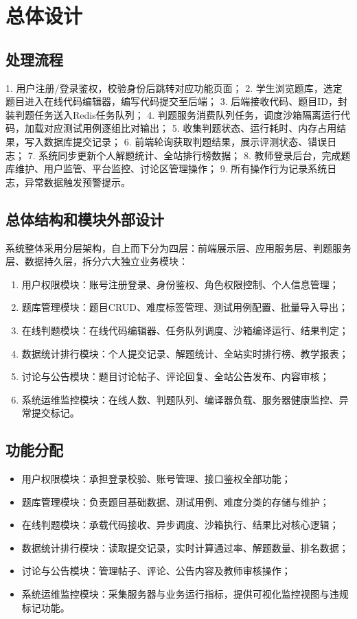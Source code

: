 \documentclass{../template/softeng}
\begin{document}
\section{总体设计}
\subsection{处理流程}
1. 用户注册/登录鉴权，校验身份后跳转对应功能页面；
2. 学生浏览题库，选定题目进入在线代码编辑器，编写代码提交至后端；
3. 后端接收代码、题目ID，封装判题任务送入Redis任务队列；
4. 判题服务消费队列任务，调度沙箱隔离运行代码，加载对应测试用例逐组比对输出；
5. 收集判题状态、运行耗时、内存占用结果，写入数据库提交记录；
6. 前端轮询获取判题结果，展示评测状态、错误日志；
7. 系统同步更新个人解题统计、全站排行榜数据；
8. 教师登录后台，完成题库维护、用户监管、平台监控、讨论区管理操作；
9. 所有操作行为记录系统日志，异常数据触发预警提示。

\subsection{总体结构和模块外部设计}
系统整体采用分层架构，自上而下分为四层：前端展示层、应用服务层、判题服务层、数据持久层，拆分六大独立业务模块：
\begin{enumerate}
    \item 用户权限模块：账号注册登录、身份鉴权、角色权限控制、个人信息管理；
    \item 题库管理模块：题目CRUD、难度标签管理、测试用例配置、批量导入导出；
    \item 在线判题模块：在线代码编辑器、任务队列调度、沙箱编译运行、结果判定；
    \item 数据统计排行模块：个人提交记录、解题统计、全站实时排行榜、教学报表；
    \item 讨论与公告模块：题目讨论帖子、评论回复、全站公告发布、内容审核；
    \item 系统运维监控模块：在线人数、判题队列、编译器负载、服务器健康监控、异常提交标记。
\end{enumerate}

\subsection{功能分配}
\begin{itemize}
    \item 用户权限模块：承担登录校验、账号管理、接口鉴权全部功能；
    \item 题库管理模块：负责题目基础数据、测试用例、难度分类的存储与维护；
    \item 在线判题模块：承载代码接收、异步调度、沙箱执行、结果比对核心逻辑；
    \item 数据统计排行模块：读取提交记录，实时计算通过率、解题数量、排名数据；
    \item 讨论与公告模块：管理帖子、评论、公告内容及教师审核操作；
    \item 系统运维监控模块：采集服务器与业务运行指标，提供可视化监控视图与违规标记功能。
\end{itemize}
\end{document}
